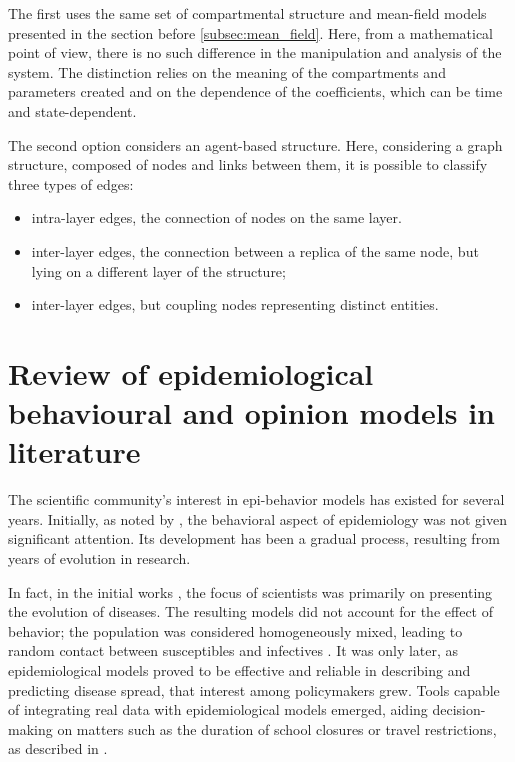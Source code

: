 The first uses the same set of compartmental structure and mean-field models presented in the section before \ref{subsec:mean_field}. Here, from a mathematical point of view, there is no such difference in the manipulation and analysis of the system. The distinction relies on the meaning of the compartments and parameters created and on the dependence of the coefficients, which can be time and state-dependent.

The second option considers an agent-based structure. Here, considering a graph structure, composed of nodes and links between them, it is possible to classify three types of edges:
\begin{itemize}
	\item intra-layer edges, the connection of nodes on the same layer.
	\item inter-layer edges, the connection between a replica of the same node, but lying on a different layer of the structure;
	\item inter-layer edges, but coupling nodes representing distinct entities. 
\end{itemize}

 
\chapter{Review of epidemiological behavioural and opinion models in literature}
\label{ch:literature_review}
The scientific community's interest in epi-behavior models has existed for several years. Initially, as noted by \cite{Bauch_2012_overview}, the behavioral aspect of epidemiology was not given significant attention. Its development has been a gradual process, resulting from years of evolution in research.

In fact, in the initial works \cite{kermack1927}, the focus of scientists was primarily on presenting the evolution of diseases. The resulting models did not account for the effect of behavior; the population was considered homogeneously mixed, leading to random contact between susceptibles and infectives \cite{Hernandez_Vargas_2022, Mata2021}. 
It was only later, as epidemiological models proved to be effective and reliable in describing and predicting disease spread, that interest among policymakers grew. Tools capable of integrating real data with epidemiological models emerged, aiding decision-making on matters such as the duration of school closures or travel restrictions, as described in \cite{Bauch_2012_overview}.


